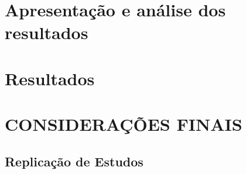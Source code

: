 \documentclass[12pt,12pt,openright,oneside,a4paper,chapter=TITLE,section=TITLE,subsection=TITLE,subsubsection=TITLE,english,french,spanish,portugues,sumario=tradicional]{abntex2}
\begin{document}
\chapter{Apresentação e análise dos resultados}

\chapter{Resultados}


\chapter*[Conclusão]{CONSIDERAÇÕES FINAIS}

\postextual


\postextual



{\begin{apendicesenv}

\renewcommand{\thechapter}{\arabic{chapter}}

\chapter{Replicação de Estudos}
\section{}
 
\end{apendicesenv}
}{}



\printbibliography
\end{document}
